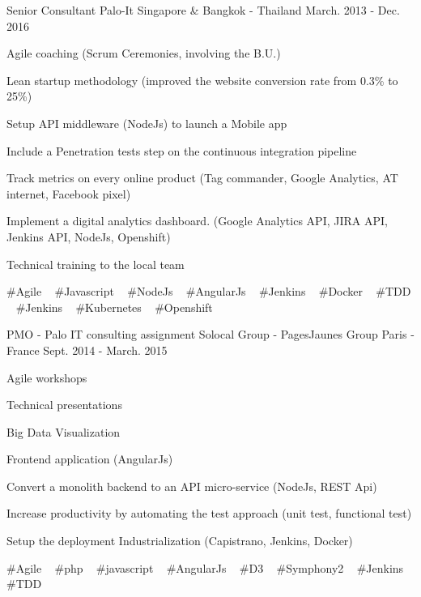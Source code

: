 \begin{cventries}
  \cventry
    {Senior Consultant} %
    {Palo-It} %
    {Singapore \& Bangkok - Thailand} %
    {March. 2013 - Dec. 2016} %
    {
      \begin{cvitems} %
        \item {Agile coaching (Scrum Ceremonies, involving the B.U.)}
        \item {Lean startup methodology (improved the website conversion rate from 0.3\% to 25\%) }
        \item {Setup API middleware (NodeJs) to launch a Mobile app}
        \item {Include a Penetration tests step on the continuous integration pipeline}
        \item {Track metrics on every online product (Tag commander, Google Analytics, AT internet, Facebook pixel)}
        \item {Implement a digital analytics dashboard. (Google Analytics API, JIRA API, Jenkins API, NodeJs, Openshift)}
        \item {Technical training to the local team}
      \end{cvitems}
    }
    {
      \#Agile ~
      \#Javascript ~
      \#NodeJs ~
      \#AngularJs ~
      \#Jenkins ~
      \#Docker ~
      \#TDD ~
      \#Jenkins ~
      \#Kubernetes ~
      \#Openshift
    }

  \cventry
    {PMO - Palo IT consulting assignment} %
    {Solocal Group - PagesJaunes Group} %
    {Paris - France} %
    {Sept. 2014 - March. 2015} %
    {
      \begin{cvitems} %
        \item {Agile workshops}
        \item {Technical presentations}
        \item {Big Data Visualization}
        \item {Frontend application (AngularJs)}
        \item {Convert a monolith backend to an API micro-service (NodeJs, REST Api)}
        \item {Increase productivity by automating the test approach (unit test, functional test)}
        \item {Setup the deployment Industrialization (Capistrano, Jenkins, Docker)}
      \end{cvitems}
    }
    {
      \#Agile ~
      \#php ~
      \#javascript ~
      \#AngularJs ~
      \#D3 ~
      \#Symphony2 ~
      \#Jenkins ~
      \#TDD
    }


\end{cventries}
